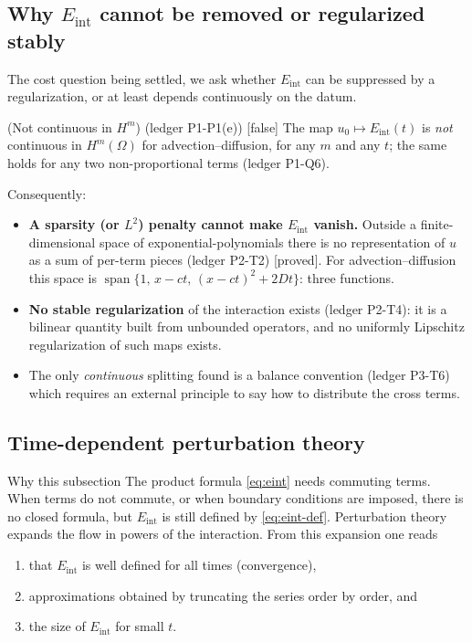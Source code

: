 \documentclass[11pt,a4paper]{article}
\theoremstyle{definition}
\newcommand{\badge}[2]{\textcolor{#1}{\textsf{\footnotesize[#2]}}}
\newcommand{\proved}[1][]{\badge{cC}{proved#1}}
\newcommand{\falsest}{\badge{cB}{false}}
\newcommand{\led}[1]{\textcolor{cG}{\textsf{\footnotesize(ledger #1)}}}
\newcommand{\Eint}{E_{\mathrm{int}}}
\DeclareMathOperator{\spn}{span}
\begin{document}
\subsection{Why $\Eint$ cannot be removed or regularized stably}
The cost question being settled, we ask whether $\Eint$ can be suppressed by a regularization, or at least depends continuously on the datum.
\begin{proposition}{(Not continuous in $H^m$) \led{P1-P1(e)} \falsest}\label{prop:discont}
The map $u_0\mapsto\Eint(t)$ is \emph{not} continuous in $H^m(\Omega)$ for advection--diffusion, for any $m$ and any $t$; the same holds for any two non-proportional terms \led{P1-Q6}.
\end{proposition}
Consequently:
\begin{itemize}[nosep]
\item \textbf{A sparsity (or $L^2$) penalty cannot make $\Eint$ vanish.} Outside a finite-dimensional space of exponential-polynomials there is no representation of $u$ as a sum of per-term pieces \led{P2-T2} \proved. For advection--diffusion this space is $\spn\{1,\,x-ct,\,(x-ct)^2+2Dt\}$: three functions.
\item \textbf{No stable regularization} of the interaction exists \led{P2-T4}: it is a bilinear quantity built from unbounded operators, and no uniformly Lipschitz regularization of such maps exists.
\item The only \emph{continuous} splitting found is a balance convention \led{P3-T6} which requires an external principle to say how to distribute the cross terms.
\end{itemize}

\subsection{Time-dependent perturbation theory}
\begin{aside}{Why this subsection}
The product formula \eqref{eq:eint} needs commuting terms. When terms do not commute, or when boundary conditions are imposed, there is no closed formula, but $\Eint$ is still defined by \eqref{eq:eint-def}. Perturbation theory expands the flow in powers of the interaction. From this expansion one reads
\begin{enumerate}[nosep,label=(\roman*)]
\item that $\Eint$ is well defined for all times (convergence),
\item approximations obtained by truncating the series order by order, and
\item the size of $\Eint$ for small $t$.
\end{enumerate}
\end{aside}
\end{document}
